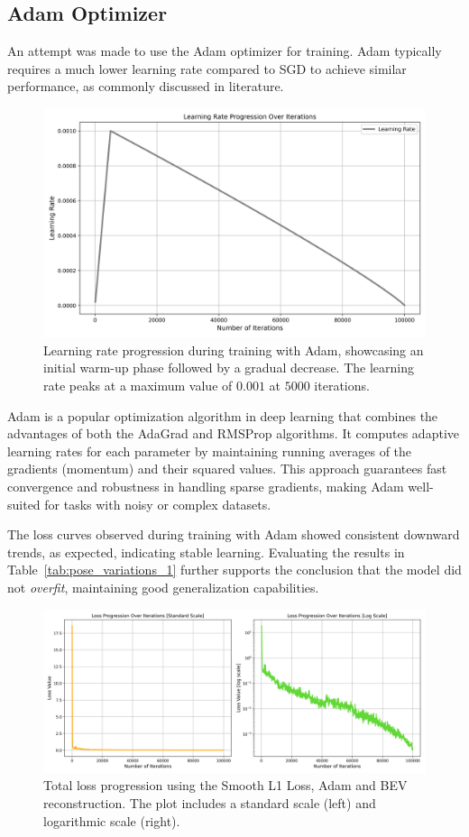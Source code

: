 \subsection*{Adam Optimizer}

An attempt was made to use the Adam optimizer for training. Adam typically requires a much lower learning rate compared to SGD to achieve similar performance, as commonly discussed in literature. 
\begin{figure}[H]
    \centering
    \includegraphics[width=0.75\linewidth]{BEV2learning_rate_progression.png}
    \caption{Learning rate progression during training with Adam, showcasing an initial warm-up phase followed by a gradual decrease. The learning rate peaks at a maximum value of $0.001$ at $5000$ iterations.}
    \label{fig:adam_learning_rate}
\end{figure}

Adam is a popular optimization algorithm in deep learning that combines the advantages of both the AdaGrad and RMSProp algorithms. It computes adaptive learning rates for each parameter by maintaining running averages of the gradients (momentum) and their squared values. This approach guarantees fast convergence and robustness in handling sparse gradients, making Adam well-suited for tasks with noisy or complex datasets.

The loss curves observed during training with Adam showed consistent downward trends, as expected, indicating stable learning. Evaluating the results in Table~\ref{tab:pose_variations_1} further supports the conclusion that the model did not \textit{overfit}, maintaining good generalization capabilities. 

\begin{figure}
    \centering
    \includegraphics[width=1\linewidth]{LateX//figs/BEV1_loss_total_l1sDEG_progression_comparison.png}
    \caption{Total loss progression using the Smooth L1 Loss, Adam and BEV reconstruction. The plot includes a standard scale (left) and logarithmic scale (right).}
    \label{fig:adam_loss_progression}
\end{figure}

